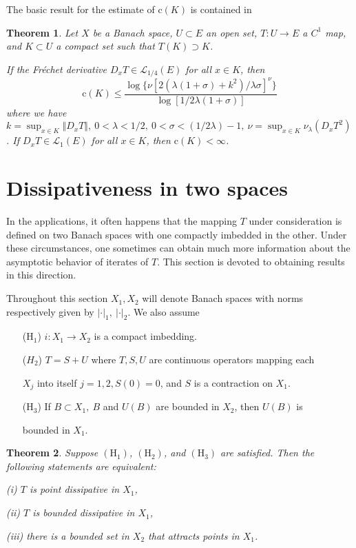 \documentclass{surv-l}
\theoremstyle{plain}
\newtheorem{theorem}{Theorem}[section]
\theoremstyle{definition}
\numberwithin{equation}{section}
\numberwithin{figure}{chapter}
\begin{document}
The basic result for the estimate of c$(K)$ is contained in

\begin{theorem}\label{thm2.8.2} Let $X$ be a Banach space, $U\subset E$ an open set, $T\!:U\rightarrow E$
a $C^{1}$ map, and $K\subset U$ a compact set such that $T(K)\supset K$.

If the Fr\'{e}chet derivative $D_{x}T\in \mathcal{L}_{1/4}(E)$ for all $x\in K$, then
\begin{equation*}
\mathrm{c}(K)\leq\frac{\log\{\nu[2(\lambda(1+\sigma)+k^{2})/\lambda\sigma]^{\nu}\}}{\log[1/2\lambda(1+\sigma)]}
\end{equation*}
where we have $k = \sup_{x\in K}\Vert D_{x}T\Vert,\ 0 < \lambda < 1/2,\ 0 < \sigma < (1/2\lambda) -1,\ \nu = \sup_{x\in K}\nu_{\lambda}(D_{x}T^{2})$. If $D_{x}T\in \mathcal{L}_{1}(E)$ for all $x\in K$, then $\mathrm{c}(K)<\infty$.
\end{theorem}

\section{Dissipativeness in two spaces}\label{sec2.9}

In the applications, it often happens that the mapping $T$ under consideration is defined on two Banach spaces with one compactly imbedded in the other. Under these circumstances, one sometimes can obtain much more information about the asymptotic behavior of iterates of $T$. This section is devoted to obtaining results in this direction.

Throughout this section $X_{1}, X_{2}$ will denote Banach spaces with norms respectively given by $| \cdot |_{1},\ | \cdot |_{2}$. We also assume
\begin{enumerate}
\item[(H$_{1}$)]\qquad $i\!:X_{1}\rightarrow X_{2}$ is a compact imbedding.
\item[($H_{2}$)]\qquad $T=S+U$ where $T, S, U$ are continuous operators mapping each
\item[]\qquad $X_{j}$ into itself $j=1,2, S(0) =0$, and $S$ is a contraction on $X_{1}$.
\item[({H}$_3$)]\qquad If $B\subset X_{1},\ B$ and $U(B)$ are bounded in $X_{2}$, then $U(B)$ is
\item[]\qquad bounded in $X_{1}$.
\end{enumerate}

\begin{theorem}\label{thm2.9.1} Suppose $(\mathrm{H}_{1})$, $(\mathrm{H}_{2})$, and $(\mathrm{H}_{3})$ are satisfied. Then the following statements are equivalent\emph{:}

\emph{(i)} $T$ is point dissipative in $X_{1}$,

\emph{(ii)} $T$ is bounded dissipative in $X_{1}$,

\emph{(iii)} there is a bounded set in $X_{2}$ that attracts points in $X_{1}$.
\end{theorem}
\end{document}
